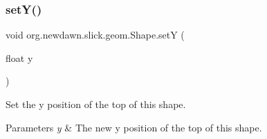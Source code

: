 \subsubsection{\texorpdfstring{set\+Y()}{setY()}}
{\footnotesize\ttfamily void org.\+newdawn.\+slick.\+geom.\+Shape.\+setY (\begin{DoxyParamCaption}\item[{float}]{y }\end{DoxyParamCaption})\hspace{0.3cm}{\ttfamily [inline]}}

Set the y position of the top of this shape.


\begin{DoxyParams}{Parameters}
{\em y} & The new y position of the top of this shape. \\
\hline
\end{DoxyParams}

